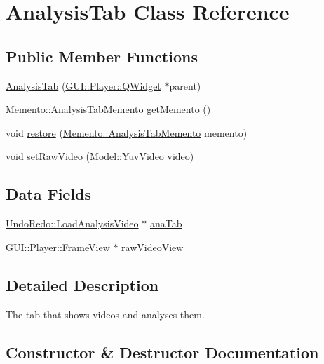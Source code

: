 \hypertarget{classGUI_1_1AnalysisTab}{}\section{Analysis\+Tab Class Reference}
\label{classGUI_1_1AnalysisTab}
\subsection*{Public Member Functions}
\begin{DoxyCompactItemize}
\item 
\hyperlink{classGUI_1_1AnalysisTab_ad7387c7350ed1011bdbf3f88e44b19ff}{Analysis\+Tab} (\hyperlink{classGUI_1_1Player_1_1QWidget}{G\+U\+I\+::\+Player\+::\+Q\+Widget} $\ast$parent)
\item 
\hyperlink{classMemento_1_1AnalysisTabMemento}{Memento\+::\+Analysis\+Tab\+Memento} \hyperlink{classGUI_1_1AnalysisTab_ad452524ed628a2eba1f167f79469b829}{get\+Memento} ()
\item 
void \hyperlink{classGUI_1_1AnalysisTab_a37a387e0b6f67a340ff7e60b2f8f7f24}{restore} (\hyperlink{classMemento_1_1AnalysisTabMemento}{Memento\+::\+Analysis\+Tab\+Memento} memento)
\item 
void \hyperlink{classGUI_1_1AnalysisTab_ae01a11c0a081e873c992ebb245295903}{set\+Raw\+Video} (\hyperlink{classModel_1_1YuvVideo}{Model\+::\+Yuv\+Video} video)
\end{DoxyCompactItemize}
\subsection*{Data Fields}
\begin{DoxyCompactItemize}
\item 
\hyperlink{classUndoRedo_1_1LoadAnalysisVideo}{Undo\+Redo\+::\+Load\+Analysis\+Video} $\ast$ \hyperlink{classGUI_1_1AnalysisTab_a3ababc5048f673abd931e7b98eaf0f99}{ana\+Tab}
\item 
\hyperlink{classGUI_1_1Player_1_1FrameView}{G\+U\+I\+::\+Player\+::\+Frame\+View} $\ast$ \hyperlink{classGUI_1_1AnalysisTab_ad1a5ead95d905d9ec387ee6c95665c38}{raw\+Video\+View}
\end{DoxyCompactItemize}


\subsection{Detailed Description}
The tab that shows videos and analyses them. 

\subsection{Constructor \& Destructor Documentation}
\hypertarget{classGUI_1_1AnalysisTab_ad7387c7350ed1011bdbf3f88e44b19ff}{}
